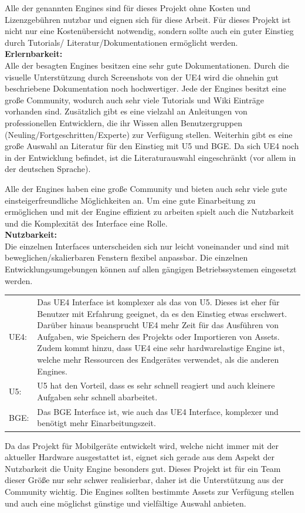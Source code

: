 Alle der genannten Engines sind für dieses Projekt ohne Kosten und Lizenzgebühren nutzbar und eignen sich für diese Arbeit.
Für dieses Projekt ist nicht nur eine Kostenübersicht notwendig, sondern sollte auch ein guter Einstieg durch Tutorials/ Literatur/Dokumentationen ermöglicht werden. \\

\textbf{Erlernbarkeit:}\\
Alle der besagten Engines besitzen eine sehr gute Dokumentationen. Durch die visuelle Unterstützung durch Screenshots von der \ac{UE4}  wird die ohnehin gut beschriebene Dokumentation noch hochwertiger. Jede der Engines besitzt eine große Community, wodurch auch sehr viele Tutorials und Wiki Einträge vorhanden sind. Zusätzlich gibt es eine  vielzahl an  Anleitungen von professionellen Entwicklern, die ihr Wissen allen Benutzergruppen (Neuling/Fortgeschritten/Experte) zur Verfügung stellen. Weiterhin gibt es eine große Auswahl an Literatur für den Einstieg mit \ac{U5} und \ac{BGE}. Da sich \ac{UE4} noch in der Entwicklung befindet, ist die Literaturauswahl eingeschränkt (vor allem in der deutschen Sprache).

Alle der Engines haben eine große Community und bieten auch sehr viele gute einsteigerfreundliche Möglichkeiten an. 
Um eine gute Einarbeitung zu ermöglichen und mit der Engine effizient zu arbeiten spielt auch die Nutzbarkeit und die Komplexität des Interface eine Rolle.\\

\textbf{Nutzbarkeit:}\\
Die einzelnen Interfaces unterscheiden sich nur leicht voneinander und sind mit beweglichen/skalierbaren Fenstern flexibel anpassbar. Die einzelnen Entwicklungsumgebungen können auf allen gängigen Betriebssystemen eingesetzt werden.
\begin{table}[H]
\centering
\begin{tabular}{lp{14.5cm}}
\ac{UE4}:& 
Das \ac{UE4} Interface ist komplexer als das von \ac{U5}. Dieses ist eher für Benutzer mit Erfahrung geeignet, da es den Einstieg etwas erschwert. Darüber hinaus beansprucht \ac{UE4} mehr Zeit für das Ausführen von Aufgaben, wie Speichern des Projekts oder Importieren von Assets. Zudem kommt hinzu, dass \ac{UE4} eine sehr hardwarelastige Engine ist, welche mehr Ressourcen des Endgerätes verwendet, als die anderen Engines.\\
\ac{U5}:&
\ac{U5} hat den Vorteil, dass es sehr schnell reagiert und auch kleinere Aufgaben sehr schnell abarbeitet.\\  
\ac{BGE}:&
Das \ac{BGE} Interface ist, wie auch das \ac{UE4} Interface, komplexer und benötigt mehr Einarbeitungszeit.
\end{tabular}
\end{table}
Da das Projekt für Mobilgeräte entwickelt wird, welche nicht immer mit der aktueller Hardware ausgestattet ist, eignet sich gerade aus dem Aspekt der Nutzbarkeit die Unity Engine besonders gut.
Dieses Projekt ist für ein Team dieser Größe nur sehr schwer realisierbar, daher ist die Unterstützung aus der Community wichtig. Die Engines sollten bestimmte Assets zur Verfügung stellen und auch eine möglichst günstige und vielfältige Auswahl anbieten.\\


